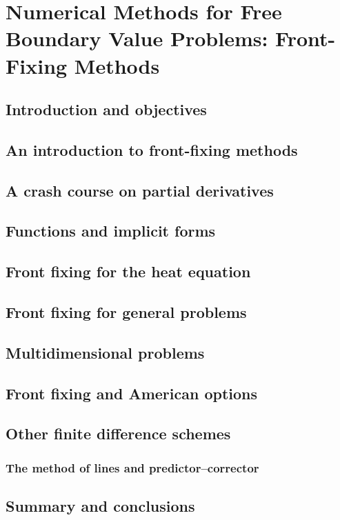 \chapter{Numerical Methods for Free Boundary Value Problems: Front-Fixing Methods}

\section{Introduction and objectives}

\section{An introduction to front-fixing methods}

\section{A crash course on partial derivatives}

\section{Functions and implicit forms}

\section{Front fixing for the heat equation}

\section{Front fixing for general problems}

\section{Multidimensional problems}

\section{Front fixing and American options}

\section{Other finite difference schemes}

\subsection{The method of lines and predictor–corrector}

\section{Summary and conclusions}